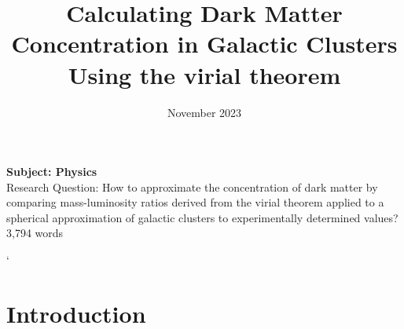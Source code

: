 \documentclass[12pt]{article}
\title{Calculating Dark Matter Concentration in Galactic Clusters Using the virial theorem}
\date{November 2023}
\begin{document}
\maketitle
\begin{center}
	\textbf{Subject: Physics} 
  \vspace{8pt} \\
	{Research Question:
    How to approximate the concentration of dark matter by comparing mass-luminosity ratios derived from the virial theorem applied to a spherical approximation of galactic clusters to experimentally determined values?} 
 \vspace{8pt} \\
	3,794 words
\end{center}

\newpage
\tableofcontents
`
\newpage
{}

\section{Introduction}
\end{document}
